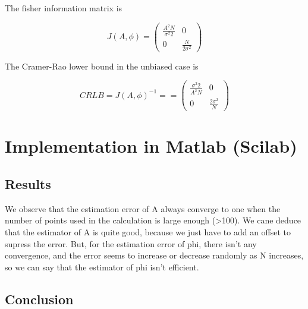 \documentclass{report}
\begin{document}
The fisher information matrix is 


\begin{equation}
J(A,\phi)=\begin{pmatrix}
\frac{A^2N}{\sigma^2 2} & 0 \\ 
0 & \frac{N}{2\sigma^2}
\end{pmatrix} 
\end{equation}

The Cramer-Rao lower bound in the unbiased case is 

\begin{equation}
CRLB = J(A,\phi)^{-1} = =\begin{pmatrix}
\frac{\sigma^2 2}{A^2N} & 0 \\ 
0 & \frac{2\sigma^2}{N}
\end{pmatrix} 
\end{equation}




























\chapter{Implementation in Matlab (Scilab)}




\section{Results}

We observe that the estimation error of A always converge to one when the 
number of points used in the calculation is large enough (>100). We cane deduce 
that the estimator of A is quite good, because we just have to add an offset to 
supress the error.
But, for the estimation error of phi, there isn't any convergence, and the 
error seems to increase or decrease randomly as N increases, so we can say that 
the estimator of phi isn't efficient.



\section{Conclusion}


\end{document}
